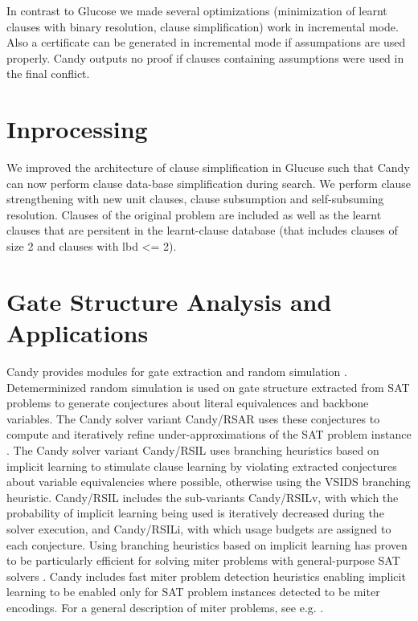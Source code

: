 \documentclass{llncs}
\begin{document}
In contrast to Glucose we made several optimizations (minimization of learnt clauses with binary resolution, clause simplification) work in incremental mode. Also a certificate can be generated in incremental mode if assumpations are used properly. Candy outputs no proof if clauses containing assumptions were used in the final conflict. 

\section{Inprocessing}

We improved the architecture of clause simplification in Glucuse such that Candy can now perform clause data-base simplification during search. We perform clause strengthening with new unit clauses, clause subsumption and self-subsuming resolution. Clauses of the original problem are included as well as the learnt clauses that are persitent in the learnt-clause database (that includes clauses of size 2 and clauses with lbd <= 2). 

\section{Gate Structure Analysis and Applications}

Candy provides modules for gate extraction \cite{Iser:2015:GateRecognition} and random simulation \cite{krohm1996use}.
Detemerminized random simulation is used on gate structure extracted from SAT problems to generate conjectures about literal equivalences and backbone variables.
The Candy solver variant Candy/RSAR uses these conjectures to compute and iteratively refine under-approximations of the SAT problem instance \cite{Kutzer:2016:Thesis}.
The Candy solver variant Candy/RSIL uses branching heuristics based on implicit learning \cite{Kutzer:2016:Thesis,DBLP:journals/jucs/LuWCMH04} to stimulate clause learning by violating extracted conjectures about variable equivalencies where possible, otherwise using the VSIDS branching heuristic.
Candy/RSIL includes the sub-variants Candy/RSILv, with which the probability of implicit learning being used is iteratively decreased during the solver execution, and Candy/RSILi, with which usage budgets are assigned to each conjecture.
Using branching heuristics based on implicit learning has proven to be particularly efficient for solving miter problems with general-purpose SAT solvers \cite{Kutzer:2016:Thesis}.
Candy includes fast miter problem detection heuristics enabling implicit learning to be enabled only for SAT problem instances detected to be miter encodings.
For a general description of miter problems, see e.g. \cite{hwmcc12Bench}.
\end{document}
